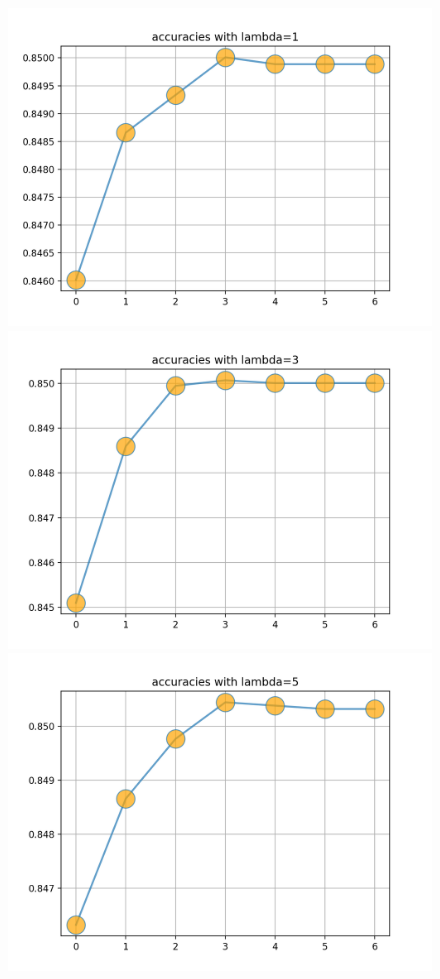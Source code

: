 \documentclass[12pt]{article}
\begin{document}
\begin{figure}[ht]
\includegraphics[scale=0.47]{4.png}
\includegraphics[scale=0.47]{5.png}
\includegraphics[scale=0.47]{6.png}
\end{figure}
\end{document}
